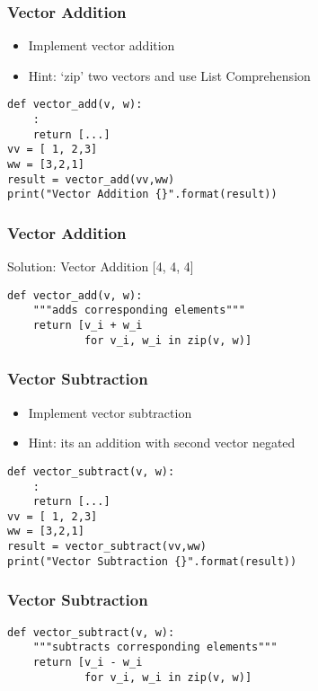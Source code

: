 \begin{frame}[fragile]\frametitle{Vector Addition}
\begin{itemize}
\item Implement vector addition
\item Hint: `zip' two vectors and use List Comprehension
\end{itemize}
\begin{lstlisting}
def vector_add(v, w):
	:
	return [...]
vv = [ 1, 2,3]
ww = [3,2,1]
result = vector_add(vv,ww)
print("Vector Addition {}".format(result))
\end{lstlisting}
\end{frame}


\begin{frame}[fragile]\frametitle{Vector Addition}
Solution: Vector Addition [4, 4, 4]

\begin{lstlisting}
def vector_add(v, w):
    """adds corresponding elements"""
    return [v_i + w_i
            for v_i, w_i in zip(v, w)]
\end{lstlisting}
\end{frame}

\begin{frame}[fragile]\frametitle{Vector Subtraction}
\begin{itemize}
\item Implement vector subtraction
\item Hint: its an addition with second vector negated
\end{itemize}
\begin{lstlisting}
def vector_subtract(v, w):
	:
	return [...]
vv = [ 1, 2,3]
ww = [3,2,1]
result = vector_subtract(vv,ww)
print("Vector Subtraction {}".format(result))
\end{lstlisting}
\end{frame}

\begin{frame}[fragile]\frametitle{Vector Subtraction}

\begin{lstlisting}
def vector_subtract(v, w):
    """subtracts corresponding elements"""
    return [v_i - w_i
            for v_i, w_i in zip(v, w)]
\end{lstlisting}
\end{frame}

